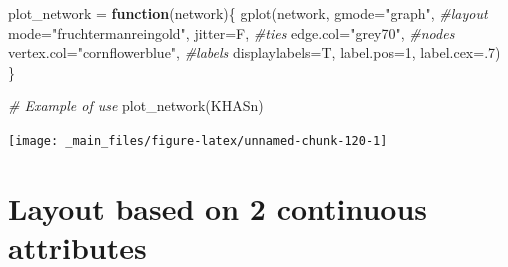\documentclass[
  notitlepage,
  onecolumn,
  openany]{book}
\newenvironment{Shaded}{\begin{snugshade}}{\end{snugshade}}
\newcommand{\AttributeTok}[1]{\textcolor[rgb]{0.77,0.63,0.00}{#1}}
\newcommand{\CommentTok}[1]{\textcolor[rgb]{0.56,0.35,0.01}{\textit{#1}}}
\newcommand{\ControlFlowTok}[1]{\textcolor[rgb]{0.13,0.29,0.53}{\textbf{#1}}}
\newcommand{\DecValTok}[1]{\textcolor[rgb]{0.00,0.00,0.81}{#1}}
\newcommand{\FunctionTok}[1]{\textcolor[rgb]{0.00,0.00,0.00}{#1}}
\newcommand{\NormalTok}[1]{#1}
\newcommand{\OtherTok}[1]{\textcolor[rgb]{0.56,0.35,0.01}{#1}}
\newcommand{\StringTok}[1]{\textcolor[rgb]{0.31,0.60,0.02}{#1}}
\begin{document}
\begin{Shaded}
\begin{Highlighting}[]
\NormalTok{plot\_network }\OtherTok{=} \ControlFlowTok{function}\NormalTok{(network)\{}
    \FunctionTok{gplot}\NormalTok{(network, }
      \AttributeTok{gmode=}\StringTok{"graph"}\NormalTok{,}
      \CommentTok{\#layout}
      \AttributeTok{mode=}\StringTok{"fruchtermanreingold"}\NormalTok{,}
      \AttributeTok{jitter=}\NormalTok{F,}
      \CommentTok{\#ties}
      \AttributeTok{edge.col=}\StringTok{"grey70"}\NormalTok{,}
      \CommentTok{\#nodes}
      \AttributeTok{vertex.col=}\StringTok{"cornflowerblue"}\NormalTok{,}
      \CommentTok{\#labels}
      \AttributeTok{displaylabels=}\NormalTok{T,}
      \AttributeTok{label.pos=}\DecValTok{1}\NormalTok{,}
      \AttributeTok{label.cex=}\NormalTok{.}\DecValTok{7}\NormalTok{)}
\NormalTok{\}}

\CommentTok{\# Example of use}
\FunctionTok{plot\_network}\NormalTok{(KHASn)}
\end{Highlighting}
\end{Shaded}

\begin{center}\texttt{[image: \_main\_files/figure-latex/unnamed-chunk-120-1]} \end{center}

\hypertarget{layout-based-on-2-continuous-attributes}{%
\section{Layout based on 2 continuous attributes}\label{layout-based-on-2-continuous-attributes}}
\end{document}
